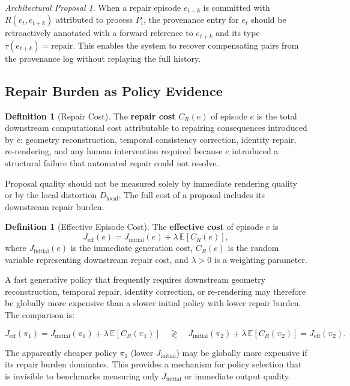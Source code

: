 \documentclass[11pt,a4paper]{article}
\theoremstyle{plain}
\theoremstyle{definition}
\newtheorem{definition}[theorem]{Definition}
\theoremstyle{remark}
\newtheorem{proposal}[theorem]{Architectural Proposal}
\begin{document}
\begin{proposal}
When a repair episode $e_{t+k}$ is committed with $R(e_t, e_{t+k})$ attributed to process $P_i$, the provenance entry for $e_t$ should be retroactively annotated with a forward reference to $e_{t+k}$ and its type $\tau(e_{t+k}) = \mathrm{repair}$. This enables the system to recover compensating pairs from the provenance log without replaying the full history.
\end{proposal}

\subsection{Repair Burden as Policy Evidence}

\begin{definition}[Repair Cost]
The \textbf{repair cost} $C_R(e)$ of episode $e$ is the total downstream computational cost attributable to repairing consequences introduced by $e$: geometry reconstruction, temporal consistency correction, identity repair, re-rendering, and any human intervention required because $e$ introduced a structural failure that automated repair could not resolve.
\end{definition}

Proposal quality should not be measured solely by immediate rendering quality or by the local distortion $D_{\mathrm{local}}$. The full cost of a proposal includes its downstream repair burden.

\begin{definition}[Effective Episode Cost]
The \textbf{effective cost} of episode $e$ is
\[
J_{\mathrm{eff}}(e) = J_{\mathrm{initial}}(e) + \lambda\, \mathbb{E}[C_R(e)],
\]
where $J_{\mathrm{initial}}(e)$ is the immediate generation cost, $C_R(e)$ is the random variable representing downstream repair cost, and $\lambda > 0$ is a weighting parameter.
\end{definition}

A fast generative policy that frequently requires downstream geometry reconstruction, temporal repair, identity correction, or re-rendering may therefore be globally more expensive than a slower initial policy with lower repair burden. The comparison is:

\[
J_{\mathrm{eff}}(\pi_1) = J_{\mathrm{initial}}(\pi_1) + \lambda\,\mathbb{E}[C_R(\pi_1)]
\quad \gtrless \quad
J_{\mathrm{initial}}(\pi_2) + \lambda\,\mathbb{E}[C_R(\pi_2)] = J_{\mathrm{eff}}(\pi_2).
\]

The apparently cheaper policy $\pi_1$ (lower $J_{\mathrm{initial}}$) may be globally more expensive if its repair burden dominates. This provides a mechanism for policy selection that is invisible to benchmarks measuring only $J_{\mathrm{initial}}$ or immediate output quality.
\end{document}
